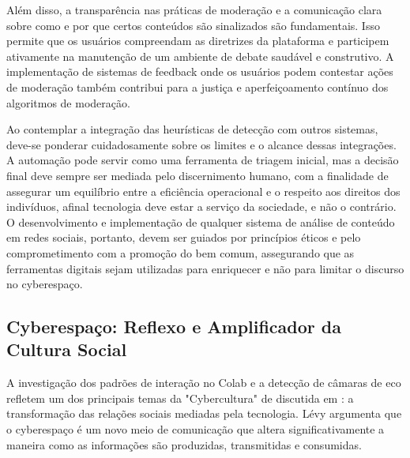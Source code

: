 Além disso, a transparência nas práticas de moderação e a comunicação clara sobre como e por que certos conteúdos são sinalizados são fundamentais. Isso permite que os usuários compreendam as diretrizes da plataforma e participem ativamente na manutenção de um ambiente de debate saudável e construtivo. A implementação de sistemas de feedback onde os usuários podem contestar ações de moderação também contribui para a justiça e aperfeiçoamento contínuo dos algoritmos de moderação.

Ao contemplar a integração das heurísticas de detecção com outros sistemas, deve-se ponderar cuidadosamente sobre os limites e o alcance dessas integrações. A automação pode servir como uma ferramenta de triagem inicial, mas a decisão final deve sempre ser mediada pelo discernimento humano, com a finalidade de assegurar um equilíbrio entre a eficiência operacional e o respeito aos direitos dos indivíduos, afinal tecnologia deve estar a serviço da sociedade, e não o contrário. O desenvolvimento e implementação de qualquer sistema de análise de conteúdo em redes sociais, portanto, devem ser guiados por princípios éticos e pelo comprometimento com a promoção do bem comum, assegurando que as ferramentas digitais sejam utilizadas para enriquecer e não para limitar o discurso no cyberespaço.

\subsection*{Cyberespaço: Reflexo e Amplificador da Cultura Social}

A investigação dos padrões de interação no Colab e a detecção de câmaras de eco refletem um dos principais temas da "Cybercultura" de discutida em : a transformação das relações sociais mediadas pela tecnologia. Lévy argumenta que o cyberespaço é um novo meio de comunicação que altera significativamente a maneira como as informações são produzidas, transmitidas e consumidas.

